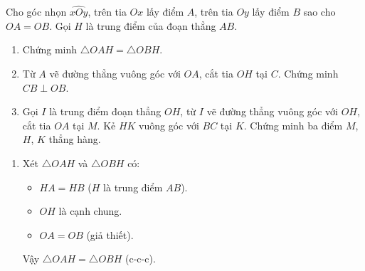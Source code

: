 		\begin{ex}%
			Cho góc nhọn $\widehat{xOy}$, trên tia $Ox$ lấy điểm $A$, trên tia $Oy$ lấy điểm $B$ sao cho $OA=OB$. Gọi $H$ là trung điểm của đoạn thẳng $AB$.
			\begin{enumerate}
				\item Chứng minh $\triangle OAH=\triangle OBH$.
				\item Từ $A$ vẽ đường thẳng vuông góc với $OA$, cắt tia $OH$ tại $C$. Chứng minh $CB\perp OB$.
				\item Gọi $I$ là trung điểm đoạn thẳng $OH$, từ $I$ vẽ đường thẳng vuông góc với $OH$, cắt tia $OA$ tại $M$. Kẻ $HK$ vuông góc với $BC$ tại $K$. Chứng minh ba điểm $M$, $H$, $K$ thẳng hàng.
			\end{enumerate}
			\loigiai
			{
			\immini
				{
					\begin{enumerate}
						\item Xét $\triangle OAH$ và $\triangle OBH$ có:
						\begin{itemize}
							\item $HA=HB$ ($H$ là trung điểm $AB$).
							\item $OH$ là cạnh chung.
							\item $OA=OB$ (giả thiết).
						\end{itemize}
						Vậy $\triangle OAH=\triangle OBH$ (c-c-c).
						

\end{enumerate}}}
\end{ex}
